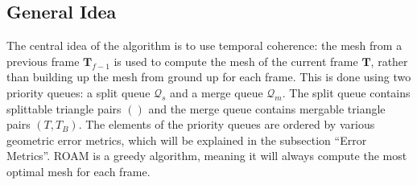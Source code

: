 \subsection{General Idea}
The central idea of the algorithm is to use temporal coherence: the mesh from a previous frame $\mathbf{T}_{f-1}$ is used to compute 
the mesh of the current frame $\mathbf{T}$, rather than building up the mesh from ground up for each frame.
This is done using two priority queues: a split queue $\mathcal{Q}_s$ and a merge queue $\mathcal{Q}_m$.
The split queue contains splittable triangle pairs $()$
and the merge queue contains mergable triangle pairs $(T,T_B)$.
The elements of the priority queues are ordered by 
various geometric error metrics, which will be explained in the subsection ``Error Metrics''.
ROAM is a greedy algorithm, meaning it will always compute the most optimal mesh for each frame.



